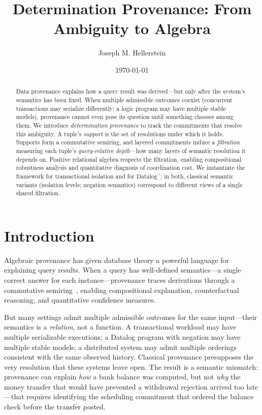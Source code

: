 \documentclass[acmsmall,review,anonymous]{acmart}
\title{Determination Provenance: From Ambiguity to Algebra}
\author{Joseph M. Hellerstein}
\affiliation{%
  \institution{University of California, Berkeley and Amazon Web Services}
  \country{USA}
}
\date{\today}
\theoremstyle{remark}
\numberwithin{definition}{section}
\numberwithin{theorem}{section}
\numberwithin{lemma}{section}
\numberwithin{corollary}{section}
\numberwithin{remark}{section}
\numberwithin{example}{section}
\numberwithin{observation}{section}
\numberwithin{assumption}{section}
\begin{document}
\begin{abstract}
  Data provenance explains how a query result was derived---but only
  after the system's semantics has been fixed.
  When multiple admissible outcomes coexist (concurrent transactions
  may serialize differently; a logic program may have multiple stable
  models), provenance cannot even pose its question until something
  chooses among them.
  We introduce \emph{determination provenance} to track the
  commitments that resolve this ambiguity.
  A tuple's \emph{support} is the set of resolutions under which it
  holds.
  Supports form a commutative semiring, and layered commitments induce
  a \emph{filtration} measuring each tuple's \emph{query-relative
  depth}---how many layers of semantic resolution it depends on.
  Positive relational algebra respects the filtration, enabling
  compositional robustness analysis and quantitative diagnosis of
  coordination cost.
  We instantiate the framework for transactional isolation and for
  $\mbox{Datalog}^\neg$; in both, classical semantic variants
  (isolation levels; negation semantics) correspond to different views
  of a single shared filtration.
\end{abstract}

\maketitle

\section{Introduction}
\label{sec:intro}

Algebraic provenance has given database theory a powerful language for
explaining query results.
When a query has well-defined semantics---a single correct answer for
each instance---provenance traces derivations through a commutative
semiring~\cite{green2007provenance,suciu2011probabilistic}, enabling
compositional explanation, counterfactual reasoning, and quantitative
confidence measures.

But many settings admit multiple admissible outcomes for the same
input---their semantics is a \emph{relation}, not a function.
A transactional workload may have multiple serializable
executions; a Datalog program with negation may have multiple stable
models; a distributed system may admit multiple orderings consistent
with the same observed history.
Classical provenance presupposes the very resolution that these
systems leave open.
The result is a semantic mismatch: provenance can explain \emph{how}
a bank balance was computed, but not \emph{why} the money transfer that would
have prevented a withdrawal rejection arrived too late---that requires
identifying the scheduling commitment that ordered the balance check
before the transfer posted.
\end{document}
